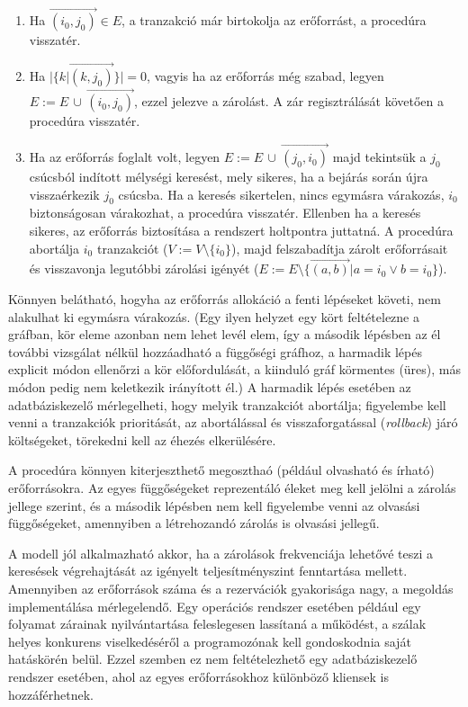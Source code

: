     \begin{enumerate}
        \item Ha $\overrightarrow{(i_0, j_0)} \in E$, a tranzakció már birtokolja az erőforrást, a procedúra visszatér.
        
        \item Ha $|\{k | \overrightarrow{(k, j_0)}\}| = 0$, vagyis ha az erőforrás még szabad, legyen $E := E \, \cup \,\overrightarrow{(i_0, j_0)}$, ezzel jelezve a zárolást. A zár regisztrálását követően a procedúra visszatér.
        
        \item Ha az erőforrás foglalt volt, legyen $E := E \, \cup \, \overrightarrow{(j_0, i_0)}$ majd tekintsük a $j_0$ csúcsból indított mélységi keresést, mely sikeres, ha a bejárás során újra visszaérkezik $j_0$ csúcsba. Ha a keresés sikertelen, nincs egymásra várakozás, $i_0$ biztonságosan várakozhat, a procedúra visszatér. Ellenben ha a keresés sikeres, az erőforrás biztosítása a rendszert holtpontra juttatná. A procedúra abortálja $i_0$ tranzakciót ($V := V \setminus \{i_0\}$), majd felszabadítja zárolt erőforrásait és visszavonja legutóbbi zárolási igényét ($E := E \setminus \{\overrightarrow{(a, b)} | a = i_0 \vee b = i_0\}$).
    \end{enumerate}
%
    Könnyen belátható, hogyha az erőforrás allokáció a fenti lépéseket követi, nem alakulhat ki egymásra várakozás. (Egy ilyen helyzet egy kört feltételezne a gráfban, kör eleme azonban nem lehet levél elem, így a második lépésben az él további vizsgálat nélkül hozzáadható a függőségi gráfhoz, a harmadik lépés explicit módon ellenőrzi a kör előfordulását, a kiinduló gráf körmentes (üres), más módon pedig nem keletkezik irányított él.) A harmadik lépés esetében az adatbáziskezelő mérlegelheti, hogy melyik tranzakciót abortálja; figyelembe kell venni a tranzakciók prioritását, az abortálással és visszaforgatással (\emph{rollback}) járó költségeket, törekedni kell az éhezés elkerülésére.
    
    A procedúra könnyen kiterjeszthető megoszthaó (például olvasható és írható) erőforrásokra. Az egyes függőségeket reprezentáló éleket meg kell jelölni a zárolás jellege szerint, és a második lépésben nem kell figyelembe venni az olvasási függőségeket, amennyiben a létrehozandó zárolás is olvasási jellegű.
    
    A modell jól alkalmazható akkor, ha a zárolások frekvenciája lehetővé teszi a keresések végrehajtását az igényelt teljesítményszint fenntartása mellett. Amennyiben az erőforrások száma és a rezervációk gyakorisága nagy, a megoldás implementálása mérlegelendő. Egy operációs rendszer esetében például egy folyamat zárainak nyilvántartása feleslegesen lassítaná a működést, a szálak helyes konkurens viselkedéséről a programozónak kell gondoskodnia saját hatáskörén belül. Ezzel szemben ez nem feltételezhető egy adatbáziskezelő rendszer esetében, ahol az egyes erőforrásokhoz különböző kliensek is hozzáférhetnek.
    
